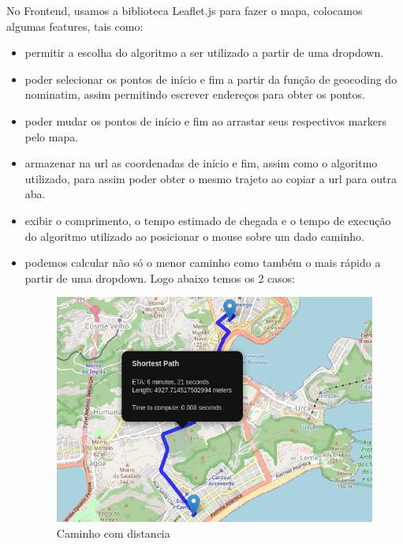\documentclass{article}
\begin{document}
No Frontend, usamos a biblioteca Leaflet.js para fazer o mapa, colocamos algumas features, tais como:
\begin{itemize}
    \item permitir a escolha do algoritmo a ser utilizado a partir de uma dropdown.
    
    \item poder selecionar os pontos de início e fim a partir da função de geocoding do nominatim, assim permitindo escrever endereços para obter os pontos.
    
    \item poder mudar os pontos de início e fim ao arrastar seus respectivos markers pelo mapa.
    
    \item armazenar na url as coordenadas de início e fim, assim como o algoritmo utilizado, para assim poder obter o mesmo trajeto ao copiar a url para outra aba.
    
    \item exibir o comprimento, o tempo estimado de chegada e o tempo de execução do algoritmo utilizado ao posicionar o mouse sobre um dado caminho.
    
    \item podemos calcular não só o menor caminho como também o mais rápido a partir de uma dropdown. Logo abaixo temos os 2 casos:
    
\begin{figure}[H]
    \centering
    \includegraphics[scale=0.65]{EDA_path_with_shortest_path.png}
    \caption{Caminho com distancia}
    \label{fig3}
\end{figure}


\end{itemize}
\end{document}
